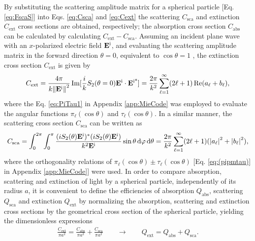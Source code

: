 By substituting the scattering amplitude matrix for a spherical particle [Eq. \eqref{eq:FscaS}]  into Eqs. \eqref{eq:Csca} and \eqref{eq:Cext}  the scattering $C_\text{sca}$ and extinction $C_\text{ext}$ cross sections are obtained, respectively; the absorption cross section $C_\text{abs}$ can be calculated by calculating $C_\text{ext} - C_\text{sca}$. Assuming an incident plane wave with an $x$-polarized electric field $\vb{E}^\text{i}$, and evaluating the scattering amplitude matrix in the forward direction $\theta = 0$, equivalent to $\cos\theta = 1$ , the extinction cross section $C_\text{ext}$ is given by
%
%
%
%
%
%
\begin{align}
	C_\text{ext} = \frac{4\pi}{k \norm{\vb{E}^\text{i}}^2}\Im[\frac{i}{k}S_2(\theta = 0)\vb{E}^\text{i}\cdot\vb{E}^\text{i*}]
	  			 = \frac{2 \pi}{k^2}\sum_{\ell = 1}^\infty (2 \ell + 1) \Re(a_\ell + b_\ell),
	\label{eq:CextSphere}
\end{align}
where the Eq. \eqref{eq:PiTau1} in Appendix \ref{app:MieCode} was employed to evaluate the angular functions $\pi_\ell(\cos\theta)$ and $\tau_\ell(\cos\theta)$. In a similar manner, the scattering cross section $C_\text{sca}$  can be written as
%
\begin{align}
C_\text{sca} = \int_0^{2\pi}\int_0^\pi  \frac{(iS_2(\theta)\vb{E}^\text{i})^*(iS_2(\theta)\vb{E}^\text{i})}{k^2\vb{E}^\text{i}} \sin\theta\dd{\varphi}\dd{\theta}
			 = \frac{2 \pi}{k^2}\sum_{\ell = 1}^\infty (2 \ell + 1) (\abs{a_\ell}^2 + \abs{b_\ell}^2),
	\label{eq:CscaSphere}
\end{align}
%
where the orthogonality relations of $\pi_\ell(\cos\theta)\pm\tau_\ell(\cos\theta)$ [Eq. \eqref{eq:(pipmtau)} in Appendix \ref{app:MieCode}] were used. In order to compare absorption, scattering and extinction of light by a spherical particle, independently of its radius $a$, it is convenient to define the efficiencies of  absorption $Q_\text{abs}$, scattering $Q_\text{sca}$ and extinction $Q_\text{ext}$  by normalizing the  absorption, scattering and extinction cross sections by the geometrical cross section of the spherical particle, yielding the dimensionless expressions
%
%
%
%
\begin{align}
 	\frac{C_\text{ext}}{\pi a^2} =   \frac{C_\text{abs}}{\pi a^2}  + \frac{C_\text{sca}}{\pi a^2}
 		\qquad \longrightarrow \qquad
	Q_\text{ext} =    Q_\text{abs}  +  Q_\text{sca}.
	\label{eq:Efficiencies}
\end{align}
%

